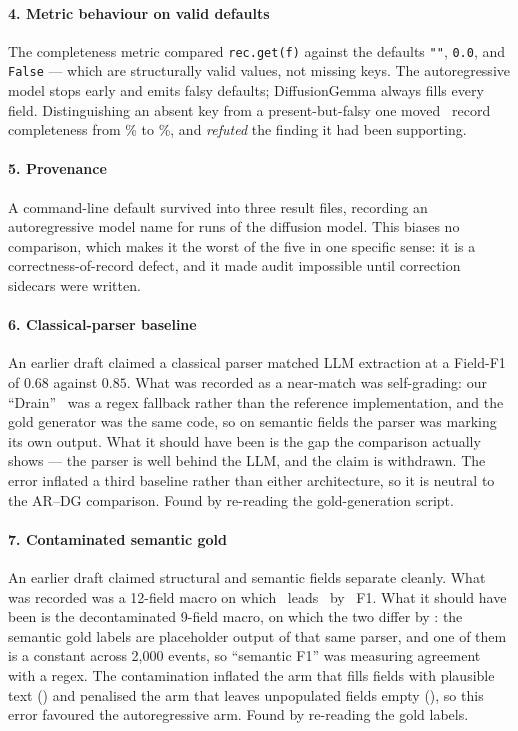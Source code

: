 \paragraph{4. Metric behaviour on valid defaults}
The completeness metric compared \texttt{rec.get(f)} against the defaults
\texttt{""}, \texttt{0.0}, and \texttt{False} --- which are structurally valid
values, not missing keys. The autoregressive model stops early and emits falsy
defaults; DiffusionGemma always fills every field. Distinguishing an absent
key from a present-but-falsy one moved \ARthree\ record completeness from
\% to \%, and \emph{refuted} the finding it
had been supporting.

\paragraph{5. Provenance}
A command-line default survived into three result files, recording an
autoregressive model name for runs of the diffusion model. This biases no
comparison, which makes it the worst of the five in one specific sense: it is
a correctness-of-record defect, and it made audit impossible until correction
sidecars were written.

\paragraph{6. Classical-parser baseline}
An earlier draft claimed a classical parser matched LLM extraction at a
Field-F1 of $0.68$ against $0.85$. What was recorded as a near-match was
self-grading: our ``Drain''~\cite{drain} was a regex fallback rather than the
reference implementation, and the gold generator was the same code, so on
semantic fields the parser was marking its own output. What it should have
been is the gap the comparison actually shows --- the parser is well behind
the LLM, and the claim is withdrawn. The error inflated a third baseline
rather than either architecture, so it is neutral to the AR--DG comparison.
Found by re-reading the gold-generation script.

\paragraph{7. Contaminated semantic gold}
An earlier draft claimed structural and semantic fields separate cleanly. What
was recorded was a 12-field macro on which \ARthree\ leads \DG\ by
\twelveGap\ F1. What it should have been is the decontaminated 9-field macro,
on which the two differ by \qualityGap: the semantic gold labels are
placeholder output of that same parser, and one of them is a constant across
2{,}000 events, so ``semantic F1'' was measuring agreement with a regex. The
contamination inflated the arm that fills fields with plausible text
(\ARthree) and penalised the arm that leaves unpopulated fields empty (\DG),
so this error favoured the autoregressive arm. Found by re-reading the gold
labels.

